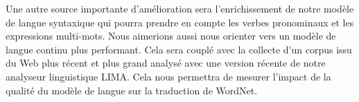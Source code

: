 Une autre source importante d'amélioration sera l'enrichissement de notre
modèle de langue syntaxique qui pourra prendre en compte les verbes pronominaux
et les expressions multi-mots. Nous aimerions aussi nous orienter vers un
modèle de langue continu \citep{haison2012continuous} plus performant. Cela
sera couplé avec la collecte d'un corpus issu du Web plus récent et plus grand
analysé avec une version récente de notre analyseur linguistique LIMA. Cela
nous permettra de mesurer l'impact de la qualité du modèle de langue sur la
traduction de WordNet.
